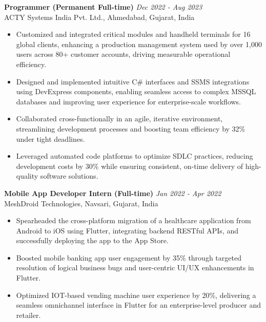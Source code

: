 \documentclass[10pt, letterpaper]{article}
\begin{document}
\vspace{0.3cm}

\textbf{Programmer (Permanent Full-time)} \hfill \textit{Dec 2022 - Aug 2023} \\
ACTY Systems India Pvt. Ltd., Ahmedabad, Gujarat, India \\
\begin{itemize}
\vspace{-0.3cm}
    \item Customized and integrated critical modules and handheld terminals for 16 global clients, enhancing a production management system used by over 1,000 users across 80+ customer accounts, driving measurable operational efficiency.
    \item Designed and implemented intuitive C\# interfaces and SSMS integrations using DevExpress components, enabling seamless access to complex MSSQL databases and improving user experience for enterprise-scale workflows.
    \item Collaborated cross-functionally in an agile, iterative environment, streamlining development processes and boosting team efficiency by 32\% under tight deadlines.
    \item Leveraged automated code platforms to optimize SDLC practices, reducing development costs by 30\% while ensuring consistent, on-time delivery of high-quality software solutions.
    
\end{itemize}
\vspace{0.2 cm}

\textbf{Mobile App Developer Intern (Full-time)} \hfill \textit{Jan 2022 - Apr 2022} \\
MeshDroid Technologies, Navsari, Gujarat, India \\
\begin{itemize}
\vspace{-0.3cm}
    \item Spearheaded the cross-platform migration of a healthcare application from Android to iOS using Flutter, integrating backend RESTful APIs, and successfully deploying the app to the App Store.
    \item Boosted mobile banking app user engagement by 35\% through targeted resolution of logical business bugs and user-centric UI/UX enhancements in Flutter.
    \item Optimized IOT-based vending machine user experience by 20\%, delivering a seamless omnichannel interface in Flutter for an enterprise-level producer and retailer.

\end{itemize}
\vspace{0.85cm}
\end{document}
